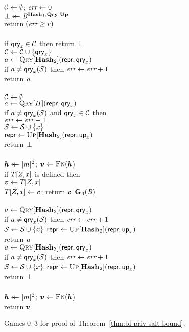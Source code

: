 \begin{figure*}
{      $\setC \gets \emptyset$;
      $\err \gets 0$\\
      $\bot \getsr \advB^{\HASHO_1,\QRYO,\UPO}$\\
      return $(\err \geq r)$
    \\[6pt]
    \\[2pt]
      if $\qry_x \in \mathcal{C}$ then return $\bot$\\
      $\setC \gets \setC \cup \{\qry_x\}$\\
      $a \gets \Qry[\HASHO_2](\pub, \qry_x)$\\
      if $a \neq \qry_x(\col)$ then $\err \gets \err + 1$\\
      return~$a$
    \\[6pt]
    \\[2pt]
      $\setC \gets \emptyset$\\
      $a \gets \Qry[H](\pub, \qry_x)$\\
      if $a \neq \qry_x(\col)$ and $\qry_x \in \setC$ then\\
      \tab $\err \gets \err-1$\\
      $\col \gets \col \union \{x\}$\\
      $\pub \gets \Up[\HASHO_2](\pub,\up_x)$\\
      return~$\bot$
    \\[6pt]
    \\[2pt]
      $\hh \getsr [m]^2$; $\vv \gets \fff(\hh$)\\
      if $T[\salt,x]$ is defined then\\
      \tab $\vv \gets T[\salt,x]$\\
      $T[\salt,x] \gets \vv$;
      return $\vv$
  }
  {
    \underline{$\game_3(\advB)$}\\[2pt]
    \\[2pt]
      $a \gets \Qry[\HASHO_3](\pub, \qry_x)$\\
      if $a \neq \qry_x(\col)$ then $\err \gets \err + 1$\\
      $\col \gets \col \union \{x\}$
      $\pub \gets \Up[\HASHO_2](\pub,\up_x)$\\
      return~$a$
  }
  {
    \\[2pt]
      $a \gets \Qry[\HASHO_3](\pub, \qry_x)$\\
      if $a \neq \qry_x(\col)$ then $\err \gets \err + 1$\\
      $\col \gets \col \union \{x\}$
      $\pub \gets \Up[\HASHO_2](\pub,\up_x)$\\
      return~$\bot$
    \\[6pt]
    \\[2pt]
      $\hh \getsr [m]^2$; $\vv \gets \fff(\hh$)\\
      return $\vv$
  }
  \caption{Games 0--3 for proof of Theorem~\ref{thm:bf-priv-salt-bound}.}
  \label{fig:bf-priv-salt-bound}
\end{figure*}

